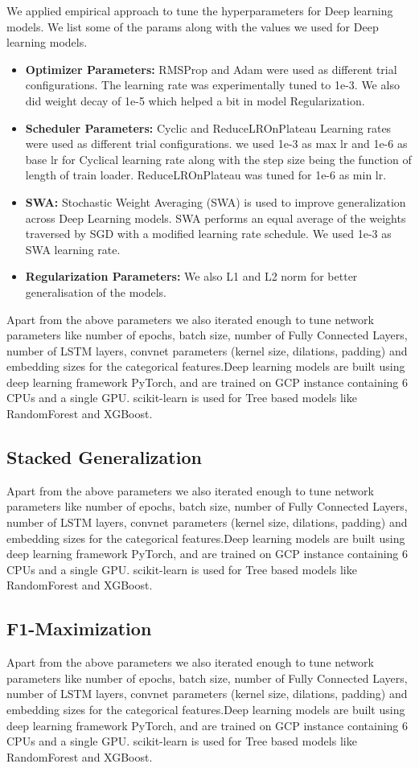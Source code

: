 We applied empirical approach to tune the hyperparameters for Deep learning models. We list some of the params
along with the values we used for Deep learning models.
  \begin{itemize}
    \item {\bf Optimizer Parameters:} RMSProp and Adam were used as different trial configurations. The learning rate 
    was experimentally tuned to 1e-3. We also did weight decay of 1e-5 which helped a bit in model Regularization.
    \item {\bf Scheduler Parameters:} Cyclic and ReduceLROnPlateau Learning rates were used as different trial configurations.
    we used 1e-3 as max lr and 1e-6 as base lr for Cyclical learning rate along with the step size being the function of
    length of train loader. ReduceLROnPlateau was tuned for 1e-6 as min lr.
    \item {\bf SWA:} Stochastic Weight Averaging (SWA) is used to improve generalization across Deep Learning
    models. SWA performs an equal average of the weights traversed by SGD with a modified learning rate schedule. We used 
    1e-3 as SWA learning rate.
    \item {\bf Regularization Parameters:} We also L1 and L2 norm for better generalisation of the models.
  \end{itemize}
Apart from the above parameters we also iterated enough to tune network parameters like number of epochs, batch size, 
number of Fully Connected Layers, number of LSTM layers, convnet parameters (kernel size, dilations, padding)
and embedding sizes for the categorical features.Deep learning models are built using deep learning framework
PyTorch, and are trained on GCP instance containing 6 CPUs and a single GPU. scikit-learn is used for Tree
based models like RandomForest and XGBoost.

\subsection{Stacked Generalization}
Apart from the above parameters we also iterated enough to tune network parameters like number of epochs, batch size, 
number of Fully Connected Layers, number of LSTM layers, convnet parameters (kernel size, dilations, padding)
and embedding sizes for the categorical features.Deep learning models are built using deep learning framework
PyTorch, and are trained on GCP instance containing 6 CPUs and a single GPU. scikit-learn is used for Tree
based models like RandomForest and XGBoost.

\subsection{F1-Maximization}
Apart from the above parameters we also iterated enough to tune network parameters like number of epochs, batch size, 
number of Fully Connected Layers, number of LSTM layers, convnet parameters (kernel size, dilations, padding)
and embedding sizes for the categorical features.Deep learning models are built using deep learning framework
PyTorch, and are trained on GCP instance containing 6 CPUs and a single GPU. scikit-learn is used for Tree
based models like RandomForest and XGBoost.
